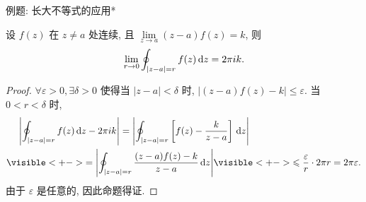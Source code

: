 \begin{frame}{例题: 长大不等式的应用*}
\beqskip{2pt}
\begin{example}
设 $f(z)$ 在 $z\neq a$ 处连续, 且 $\lim\limits_{z\to a}(z-a)f(z)=k$, 则
\[\lim
_{r\to0}\oint_{|z-a|=r}f(z)\,\mathrm{d} z=2\pi ik.\]
\end{example}
\begin{proof}
$\forall \varepsilon>0,\exists\delta>0$ 使得当 $|z-a|<\delta$ 时, $|(z-a)f(z)-k|\le\varepsilon$.
\onslide<+->
当 $0<r<\delta$ 时,
\begin{align*}
&\peq\abs{\oint_{|z-a|=r}f(z)\diff z-2\pi i k}
=\abs{\oint_{|z-a|=r}\left[f(z)-\frac k{z-a}\right]\diff z}\\
&\visible<+->{=\abs{\oint_{|z-a|=r}\frac{(z-a)f(z)-k}{z-a}\diff z}}
\visible<+->{\le \frac{\varepsilon}r\cdot 2\pi r=2\pi\varepsilon.}
\end{align*}
\onslide<+->
由于 $\varepsilon$ 是任意的, 因此命题得证.
\end{proof}
\endgroup
\end{frame}

